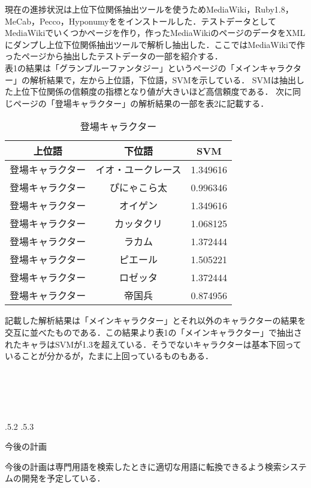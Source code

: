 \documentclass[uplatex]{jsarticle}
\makeatletter
\renewcommand{\section}{%
    \if@slide\clearpage\fi
    \@startsection{section}{1}{\z@}%
    {\Cvs \@plus.5\Cdp \@minus.2\Cdp}%
    {.5\Cvs \@plus.3\Cdp}%
    {\normalfont\raggedright}}
\makeatother
\begin{document}
現在の進捗状況は上位下位関係抽出ツールを使うためMediaWiki，Ruby1.8，MeCab，Pecco，Hyponumyををインストールした．テストデータとしてMediaWikiでいくつかページを作り，作ったMediaWikiのページのデータをXMLにダンプし上位下位関係抽出ツールで解析し抽出した．ここではMediaWikiで作ったページから抽出したテストデータの一部を紹介する．\\



表1の結果は「グランブルーファンタジー」というページの「メインキャラクター」の解析結果で，左から上位語，下位語，SVMを示している．
SVMは抽出した上位下位関係の信頼度の指標となり値が大きいほど高信頼度である．
次に同じページの「登場キャラクター」の解析結果の一部を表2に記載する．

\begin{wraptable}[10]{r}[1cm]{8cm}
\vspace*{-\intextsep}
\caption{登場キャラクター}\label{サンプル表}
\begin{tabular}{ccc}\hline
上位語 & 下位語 & SVM \\
\hline
{登場キャラクター} & イオ・ユークレース & 1.349616\\
{登場キャラクター} & ぴにゃこら太 & 0.996346\\
{登場キャラクター} &オイゲン & 1.349616\\
{登場キャラクター} & カッタクリ & 1.068125\\
{登場キャラクター} & ラカム & 1.372444\\
{登場キャラクター} & ピエール &1.505221\\
{登場キャラクター} & ロゼッタ & 1.372444\\
{登場キャラクター} & 帝国兵& 0.874956\\\hline
\end{tabular}
\end{wraptable}

記載した解析結果は「メインキャラクター」とそれ以外のキャラクターの結果を交互に並べたものである．この結果より表1の「メインキャラクター」で抽出されたキャラはSVMが1.3を超えている．そうでないキャラクターは基本下回っていることが分かるが，たまに上回っているものもある．\\
\\
\\
\\
\\
\\


\section{今後の計画}


今後の計画は専門用語を検索したときに適切な用語に転換できるよう検索システムの開発を予定している．



\end{document}
